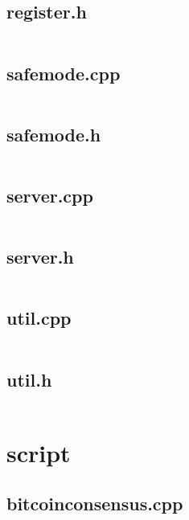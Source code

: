 \documentclass{article}
\begin{document}
\subsection{register.h}
\inputminted{cpp}{/home/dufferzafar/dev/@clones/bitcoin/src/rpc/register.h}
\newpage

\subsection{safemode.cpp}
\inputminted{cpp}{/home/dufferzafar/dev/@clones/bitcoin/src/rpc/safemode.cpp}
\newpage

\subsection{safemode.h}
\inputminted{cpp}{/home/dufferzafar/dev/@clones/bitcoin/src/rpc/safemode.h}
\newpage

\subsection{server.cpp}
\inputminted{cpp}{/home/dufferzafar/dev/@clones/bitcoin/src/rpc/server.cpp}
\newpage

\subsection{server.h}
\inputminted{cpp}{/home/dufferzafar/dev/@clones/bitcoin/src/rpc/server.h}
\newpage

\subsection{util.cpp}
\inputminted{cpp}{/home/dufferzafar/dev/@clones/bitcoin/src/rpc/util.cpp}
\newpage

\subsection{util.h}
\inputminted{cpp}{/home/dufferzafar/dev/@clones/bitcoin/src/rpc/util.h}
\newpage

\section{script}

\subsection{bitcoinconsensus.cpp}
\inputminted{cpp}{/home/dufferzafar/dev/@clones/bitcoin/src/script/bitcoinconsensus.cpp}
\newpage
\end{document}
